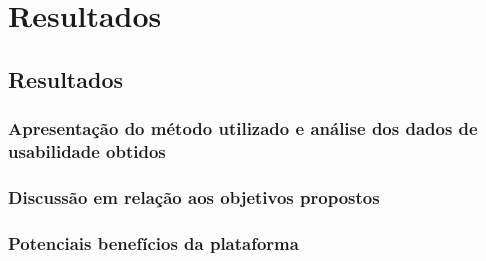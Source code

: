 \part{Resultados}
\chapter[Resultados]{Resultados}
\section{Apresentação do método utilizado e análise dos dados de usabilidade obtidos}
\section{Discussão em relação aos objetivos propostos}
\section{Potenciais benefícios da plataforma}
